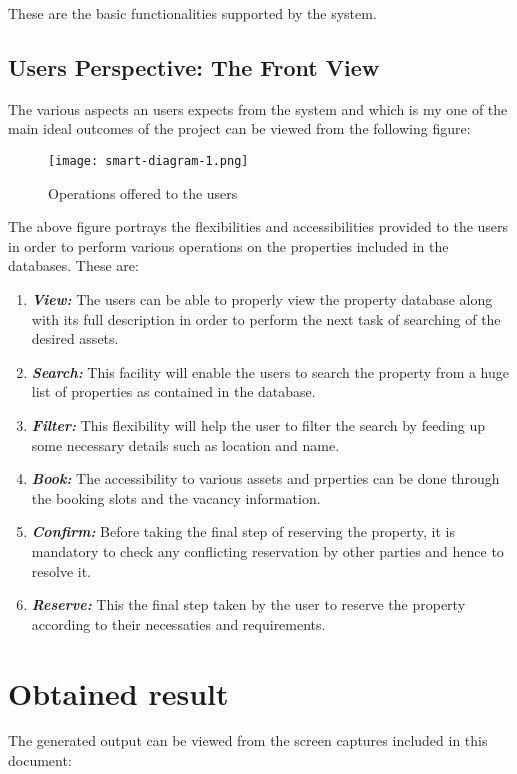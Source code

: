 \documentclass[12pt]{report}
\begin{document}
These are the basic functionalities supported by the system. 
\newpage


\subsection{Users Perspective: The Front View}
The various aspects an users expects from the system and which is my one of the main ideal outcomes of the project can be viewed from the following figure:

\begin{figure}[!htb]
\texttt{[image: smart-diagram-1.png]}
\centering
\caption{Operations offered to the users}
\end{figure}

The above figure portrays the flexibilities and accessibilities provided to the users in order to perform various operations on the properties included in the databases. These are:
\begin{enumerate}
\item \textbf{\textit{View:}} The users can be able to properly view the property database along with its full description in order to perform the next task of searching of the desired assets.
\item \textbf{\textit{Search:}} This facility will enable the users to search the property from a huge list of properties as contained in the database.
\item \textbf{\textit{Filter:}} This flexibility will help the user to filter the search by feeding up some necessary details such as location and name.
\item \textbf{\textit{Book:}} The accessibility to various assets and prperties can be done through the booking slots and the vacancy information.
 \item \textbf{\textit{Confirm:}} Before taking the final step of reserving the property, it is mandatory to check any conflicting reservation by other parties and hence to resolve it.
\item \textbf{\textit{Reserve:}} This the final step taken by the user to reserve the property according to their necessaties and requirements.
\end{enumerate}
\newpage
\section{Obtained result}

The generated output can be viewed from the screen captures included in this document:
\end{document}
